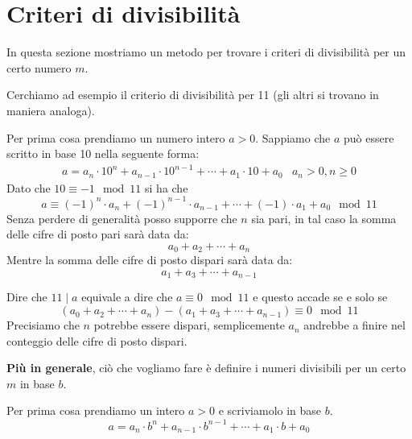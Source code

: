 \section{Criteri di divisibilit\`a}
In questa sezione mostriamo un metodo per trovare i criteri di divisibilit\`a per un certo
numero $m$.

\begin{example}
	Cerchiamo ad esempio il criterio di divisibilit\`a per 11 (gli altri si trovano in maniera
	analoga).

	Per prima cosa prendiamo un numero intero $a > 0$. Sappiamo che $a$ pu\`o essere scritto
	in base 10 nella seguente forma:
	\begin{equation*}
		\begin{array}{lr}
			a = a_n \cdot 10^n + a_{n-1} \cdot 10^{n - 1} + \cdots + a_1 \cdot 10 + a_0
			 & a_n > 0, n \geq 0
		\end{array}
	\end{equation*}
	Dato che $10 \equiv -1 \mod{11}$ si ha che
	\begin{equation*}
		a \equiv (-1)^n \cdot a_n  + (-1)^{n-1} \cdot a_{n-1} + \cdots + (-1) \cdot a_1 + a_0
		\mod{11}
	\end{equation*}
	Senza perdere di generalit\`a posso supporre che $n$ sia pari, in tal caso la somma delle
	cifre di posto pari sar\`a data da:
	\begin{equation*}
		a_0 + a_2 + \cdots + a_n
	\end{equation*}
	Mentre la somma delle cifre di posto dispari sar\`a data da:
	\begin{equation*}
		a_1 + a_3 + \cdots + a_{n-1}
	\end{equation*}

	Dire che $11 \mid a$ equivale a dire che $a \equiv 0 \mod{11}$ e questo accade se e solo se
	\begin{equation*}
		(a_0 + a_2 + \cdots + a_n) - (a_1 + a_3 + \cdots + a_{n-1}) \equiv 0 \mod{11}
	\end{equation*}
	Precisiamo che $n$ potrebbe essere dispari, semplicemente $a_n$ andrebbe a finire nel
	conteggio delle cifre di posto dispari.
\end{example}

\textbf{Pi\`u in generale}, ci\`o che vogliamo fare \`e definire i numeri divisibili per un
certo $m$ in base $b$.

Per prima cosa prendiamo un intero $a > 0$ e scriviamolo in base $b$.
\begin{equation*}
	a = a_n \cdot b^n + a_{n-1} \cdot b^{n-1} + \cdots + a_1 \cdot b + a_0
\end{equation*}

